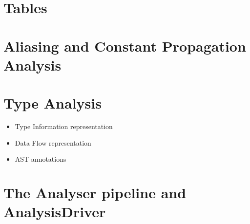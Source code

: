    \section{Tables}
    
    \section{Aliasing and Constant Propagation Analysis}   
    
    \section{Type Analysis}
        \begin{itemize}
            \item Type Information representation
            \item Data Flow representation
            \item AST annotations
        \end{itemize}

    \section{The Analyser pipeline and AnalysisDriver}

